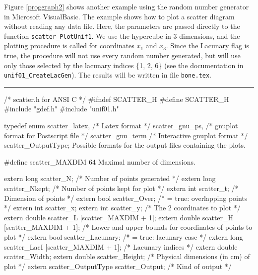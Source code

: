 Figure \ref{proggraph2} shows another example using the
random number generator in Microsoft VisualBasic. The example
shows how to plot a scatter diagram without reading any data file.
Here, the parameters are passed directly to the function
{\tt scatter\_PlotUnif1}.
We use the hypercube in 3 dimensions, and the
 plotting procedure is called for coordinates $x_1$ and $x_{3}$.
 Since the Lacunary flag is true,
the procedure will not use every random number generated, but will
use only those selected by the lacunary indices \{1, 2, 6\}
(see the documentation in {\tt unif01\_CreateLacGen}).
The results will be written in file {\tt bone.tex}.

\vspace{10mm}
\bigskip
\hrule
\code
\hide
/* scatter.h  for ANSI C */
#ifndef SCATTER_H
#define SCATTER_H
\endhide
#include "gdef.h"
#include "unif01.h"
\endcode



\code

typedef enum {
   scatter_latex,                 /* Latex format */
   scatter_gnu_ps,                /* gnuplot format for Postscript file */
   scatter_gnu_term               /* Interactive gnuplot format */
   } scatter_OutputType;
\endcode
 \tab
  Possible formats for the output files containing the plots.
 \endtab


\code

#define scatter_MAXDIM 64
\endcode
 \tab
  Maximal number of dimensions.
 \endtab

\ifdetailed  %

\code

extern long scatter_N;             /* Number of points generated */
extern long scatter_Nkept;         /* Number of points kept for plot */
extern int scatter_t;              /* Dimension of points */
extern bool scatter_Over;        /* = true: overlapping points */
extern int scatter_x;
extern int scatter_y;              /* The 2 coordinates to plot */
extern double scatter_L [scatter_MAXDIM + 1];
extern double scatter_H [scatter_MAXDIM + 1];
                                   /* Lower and upper bounds for coordinates
                                      of points to plot */
\endcode
\code
extern bool scatter_Lacunary;    /* = true: lacunary case */
extern long scatter_LacI [scatter_MAXDIM + 1];  /* Lacunary indices */
extern double scatter_Width;
extern double scatter_Height;      /* Physical dimensions (in cm) of plot */
extern scatter_OutputType scatter_Output;       /* Kind of output */
\endcode

